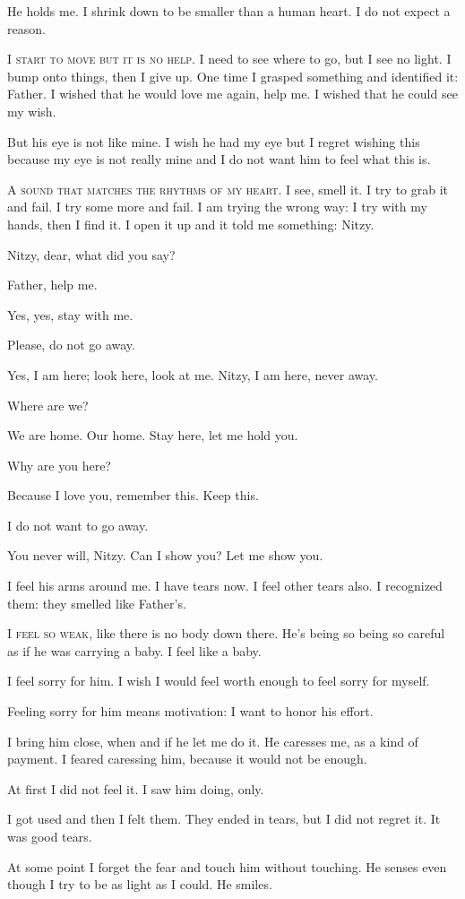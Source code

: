 He holds me. I shrink down to be smaller than a human heart. I do not expect a reason.

\bigskip\thinspace\textsc{I start to move but it is no help.} I need to see where to go, but I see no light. I bump onto things, then I give up. One time I grasped something and identified it: Father. I wished that he would love me again, help me. I wished that he could see my wish. 

But his eye is not like mine. I wish he had my eye but I regret wishing this because my eye is not really mine and I do not want him to feel what this is. 

\bigskip\thinspace\textsc{A sound that matches the rhythms of my heart.} I see, smell it. I try to grab it and fail. I try some more and fail. I am trying the wrong way: I try with my hands, then I find it. I open it up and it told me something: Nitzy. 

Nitzy, dear, what did you say?

Father, help me.

Yes, yes, stay with me.

Please, do not go away.

Yes, I am here; look here, look at me. Nitzy, I am here, never away.

Where are we?

We are home. Our home. Stay here, let me hold you.

Why are you here?

Because I love you, remember this. Keep this.

I do not want to go away.

You never will, Nitzy. Can I show you? Let me show you.

I feel his arms around me. I have tears now. I feel other tears also. I recognized them: they smelled like Father's.


\bigskip\thinspace\textsc{I feel so weak,} like there is no body down there. He's being so being so careful as if he was carrying a baby. I feel like a baby.

I feel sorry for him. I wish I would feel worth enough to feel sorry for myself.

Feeling sorry for him means motivation: I want to honor his effort. 

I bring him close, when and if he let me do it. He caresses me, as a kind of payment. I feared caressing him, because it would not be enough.

At first I did not feel it. I saw him doing, only.

I got used and then I felt them. They ended in tears, but I did not regret it. It was good tears.

At some point I forget the fear and touch him without touching. He senses even though I try to be as light as I could. He smiles.

